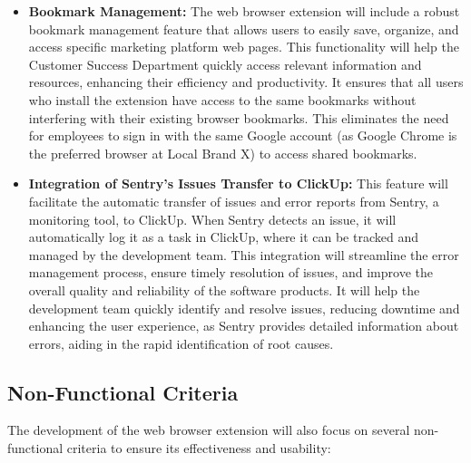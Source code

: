 \begin{itemize}
    \item \textbf{Bookmark Management:}
    The web browser extension will include a robust bookmark management feature that allows users to easily save, organize, and access specific marketing platform web pages. This functionality will help the Customer Success Department quickly access relevant information and resources, enhancing their efficiency and productivity. It ensures that all users who install the extension have access to the same bookmarks without interfering with their existing browser bookmarks. This eliminates the need for employees to sign in with the same Google account (as Google Chrome is the preferred browser at Local Brand X) to access shared bookmarks.


    \item \textbf{Integration of Sentry's Issues Transfer to ClickUp:}
    This feature will facilitate the automatic transfer of issues and error reports from Sentry, a monitoring tool, to ClickUp. When Sentry detects an issue, it will automatically log it as a task in ClickUp, where it can be tracked and managed by the development team. This integration will streamline the error management process, ensure timely resolution of issues, and improve the overall quality and reliability of the software products. It will help the development team quickly identify and resolve issues, reducing downtime and enhancing the user experience, as Sentry provides detailed information about errors, aiding in the rapid identification of root causes.
\end{itemize}

\subsection{Non-Functional Criteria}
The development of the web browser extension will also focus on several non-functional criteria to ensure its effectiveness and usability:

